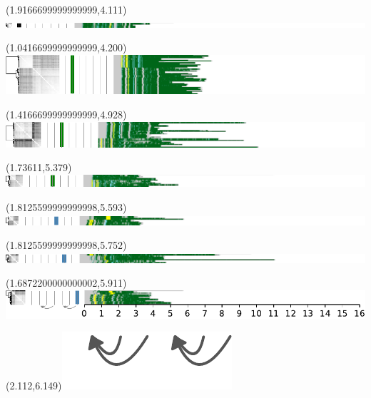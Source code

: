 \documentclass{article}
\begin{document}
\begin{textblock}{13}(1.9166699999999999,4.111)\includegraphics{./Figure_S5/chr11-HG001.pdf}\end{textblock}
\begin{textblock}{13}(1.0416699999999999,4.200)\includegraphics{./Figure_S5/chr11-HG002.pdf}\end{textblock}
\begin{textblock}{13}(1.4166699999999999,4.928)\includegraphics{./Figure_S5/chr11-HG003.pdf}\end{textblock}
\begin{textblock}{13}(1.73611,5.379)\includegraphics{./Figure_S5/chr11-HG004.pdf}\end{textblock}
\begin{textblock}{13}(1.8125599999999998,5.593)\includegraphics{./Figure_S5/chr11-HG005.pdf}\end{textblock}
\begin{textblock}{13}(1.8125599999999998,5.752)\includegraphics{./Figure_S5/chr11-HG006.pdf}\end{textblock}
\begin{textblock}{13}(1.6872200000000002,5.911)\includegraphics{./Figure_S5/chr11-HG007.pdf}\end{textblock}
\begin{textblock}{13}(2.112,6.149)\includegraphics[width=.755in,keepaspectratio]{Figure_4/fatter-arrows.pdf}\end{textblock}
\end{document}
